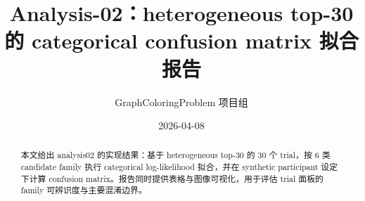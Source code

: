 \title{Analysis-02：heterogeneous top-30 的 categorical confusion matrix 拟合报告}
\author{GraphColoringProblem 项目组}
\date{2026-04-08}
\maketitle

\begin{abstract}
本文给出 analysis02 的实现结果：基于 heterogeneous top-30 的 30 个 trial，按 6 类 candidate family 执行 categorical log-likelihood 拟合，并在 synthetic participant 设定下计算 confusion matrix。报告同时提供表格与图像可视化，用于评估 trial 面板的 family 可辨识度与主要混淆边界。

\end{abstract}